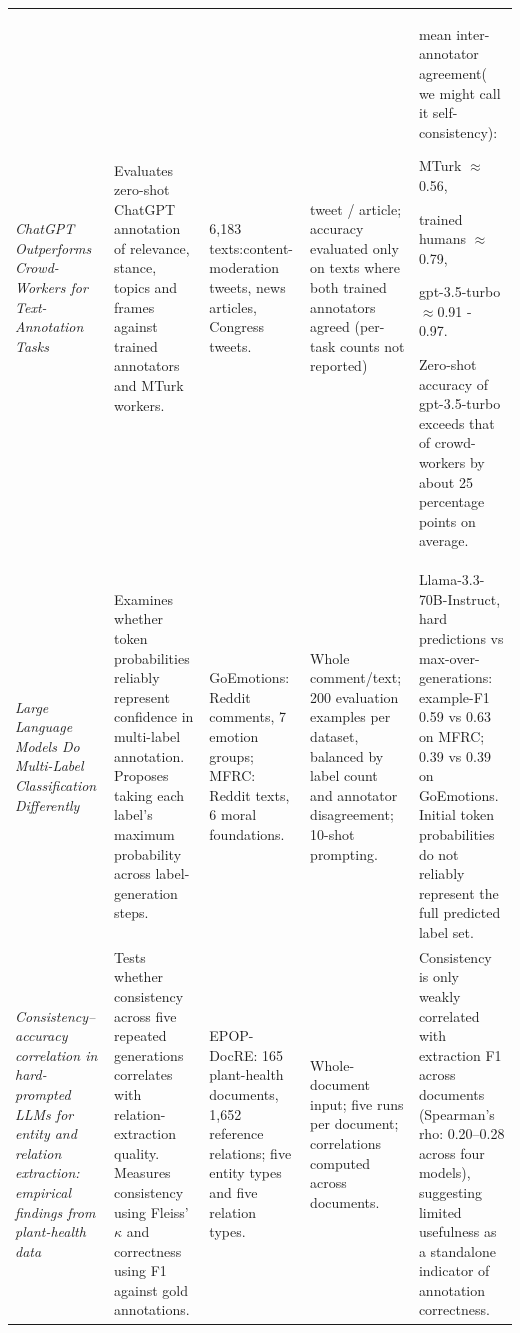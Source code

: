 \documentclass[11pt]{article}
\begin{document}
\begin{table}[t!]
\begin{tabular}{@{}P{0.19\textwidth} P{0.19\textwidth} P{0.13\textwidth} P{0.17\textwidth} P{0.25\textwidth}@{}}
\\


\textit{ChatGPT Outperforms Crowd-Workers for Text-Annotation Tasks} \cite{chat-gpt-outperform-crowd} & Evaluates zero-shot ChatGPT annotation of relevance, stance, topics and frames against trained annotators and MTurk workers. & 6,183 texts:content-moderation tweets, news articles, Congress tweets. & tweet / article; accuracy evaluated only on texts where both trained annotators agreed (per-task counts not reported) & mean inter-annotator agreement( we might call it self-consistency): 

MTurk $\approx$0.56, 

trained humans $\approx$0.79,

gpt-3.5-turbo $\approx$0.91 - 0.97. 

Zero-shot accuracy of gpt-3.5-turbo exceeds that of crowd-workers by about 25 percentage points on average.
\\


\textit{Large Language Models Do Multi-Label Classification Differently} \cite{large-lang-mod-do-multi}
& Examines whether token probabilities reliably represent confidence in multi-label annotation. Proposes taking each label's maximum probability across label-generation steps.
& GoEmotions: Reddit comments, 7 emotion groups; MFRC: Reddit texts, 6 moral foundations.
& Whole comment/text; 200 evaluation examples per dataset, balanced by label count and annotator disagreement; 10-shot prompting.
& Llama-3.3-70B-Instruct, hard predictions vs max-over-generations: example-F1 0.59 vs 0.63 on MFRC; 0.39 vs 0.39 on GoEmotions. Initial token probabilities do not reliably represent the full predicted label set.
\\


\textit{Consistency–accuracy correlation in hard-prompted LLMs for entity and relation extraction: empirical findings from plant-health data} \cite{consistency-accuracy-correl} & Tests whether consistency across five repeated generations correlates with relation-extraction quality. Measures consistency using Fleiss’ $\kappa$ and correctness using F1 against gold annotations. 
& 
EPOP-DocRE: 165 plant-health documents, 1,652 reference relations; five entity types and five relation types.
& Whole-document input; five runs per document; correlations computed across documents. 
& Consistency is only weakly correlated with extraction F1 across documents (Spearman’s rho: 0.20–0.28 across four models), suggesting limited usefulness as a standalone indicator of annotation correctness.
\\



\end{tabular}
\end{table}
\end{document}
